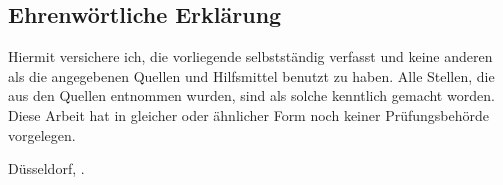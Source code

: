 \begin{otherlanguage}{ngerman}

\chapter*{Ehrenwörtliche Erklärung}

Hiermit versichere ich, die vorliegende \thesistypegerman{} selbstständig verfasst und keine anderen als die angegebenen Quellen und Hilfsmittel benutzt zu haben.
Alle Stellen, die aus den Quellen entnommen wurden, sind als solche kenntlich gemacht worden.
Diese Arbeit hat in gleicher oder ähnlicher Form noch keiner Prüfungsbehörde vorgelegen.

\vspace{3cm}

\noindent Düsseldorf, \thesissubmissionday{}. \DTMmonthname{\thesissubmissionmonth} \thesissubmissionyear{} \hfill \makeatletter\@author\makeatother

\end{otherlanguage}
